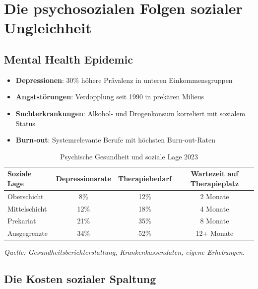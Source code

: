\section{Die psychosozialen Folgen sozialer Ungleichheit}

\subsection{Mental Health Epidemic}

\begin{itemize}
    \item \textbf{Depressionen}: 30\% höhere Prävalenz in unteren Einkommensgruppen
    \item \textbf{Angststörungen}: Verdopplung seit 1990 in prekären Milieus
    \item \textbf{Suchterkrankungen}: Alkohol- und Drogenkonsum korreliert mit sozialem Status
    \item \textbf{Burn-out}: Systemrelevante Berufe mit höchsten Burn-out-Raten
\end{itemize}

\begin{table}[ht]
    \centering
    \caption{Psychische Gesundheit und soziale Lage 2023}
    \label{tab:psychische_gesundheit}
    \begin{tabular}{lccc}
        \toprule
        \textbf{Soziale Lage} & \textbf{Depressionsrate} & \textbf{Therapiebedarf} & \textbf{Wartezeit auf Therapieplatz} \\
        \midrule
        Oberschicht & 8\% & 12\% & 2 Monate \\
        Mittelschicht & 12\% & 18\% & 4 Monate \\
        Prekariat & 21\% & 35\% & 8 Monate \\
        Ausgegrenzte & 34\% & 52\% & 12+ Monate \\
        \bottomrule
    \end{tabular}
\end{table}

\begin{flushleft}
\footnotesize{\textit{Quelle: Gesundheitsberichterstattung, Krankenkassendaten, eigene Erhebungen.}}
\end{flushleft}

\subsection{Die Kosten sozialer Spaltung}

